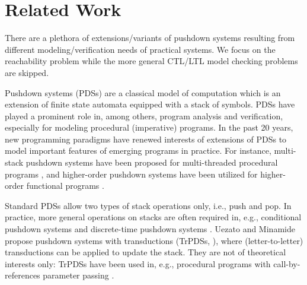 \documentclass[preprint,12pt]{elsarticle}
\begin{document}
\section{Related Work}
%
%

There are a plethora of extensions/variants of pushdown systems resulting from different modeling/verification needs of practical systems. 
We focus on the reachability problem while the more general CTL/LTL model checking problems are skipped. 

Pushdown systems (PDSs) are a classical model of computation which is an extension of finite state automata equipped with a stack of symbols. PDSs have played a prominent role in, among others, program analysis and verification, especially for modeling procedural (imperative) programs. In the past 20 years, new programming paradigms have renewed interests of extensions of PDSs to model important features of emerging programs in practice. For instance, 
multi-stack pushdown systems have been proposed for multi-threaded procedural programs \cite{QR05,BESS05,TMP07}, and higher-order pushdown systems have been utilized for higher-order functional programs \cite{HMOS08,HMOS17}.

Standard PDSs allow two types of stack operations only, i.e., push and pop. In practice, more general operations on stacks are often required in, e.g.,  conditional pushdown systems \cite{EKS03,LO10} and discrete-time pushdown systems \cite{AAS12}. Uezato and Minamide propose pushdown systems with transductions (TrPDSs, \cite{UM13}), where (letter-to-letter) transductions can be applied to update the stack. They are not of theoretical interests only: TrPDSs have been 
used in, e.g., procedural programs with call-by-references parameter passing \cite{SM+15,Song18}.



%
\end{document}
